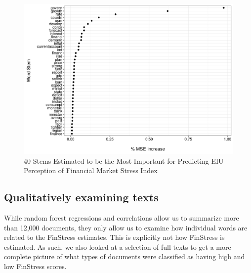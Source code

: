 \documentclass[]{article}
\begin{document}
\begin{figure}
    \caption{40 Stems Estimated to be the Most Important for Predicting EIU Perception of Financial Market Stress Index}
    \label{rf_importance}

    \begin{center}
        \includegraphics[scale=0.5]{figures/rf_stem_importance.pdf}
    \end{center}

\end{figure}





\subsection{Qualitatively examining texts}

While random forest regressions and correlations allow us to summarize more than 12,000 documents, they only allow us to examine how individual words are related to the FinStress estimates. This is explicitly not how FinStress is estimated. As such, we also looked at a selection of full texts to get a more complete picture of what types of documents were classified as having high and low FinStress scores.
\end{document}
